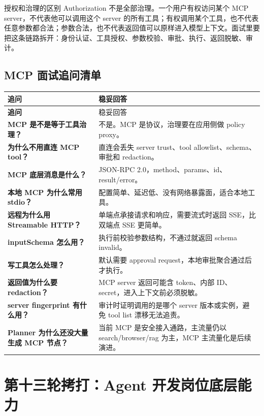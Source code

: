 \begin{analysisBox}{授权和治理的区别}
Authorization 不是全部治理。一个用户有权访问某个 MCP server，不代表他可以调用这个 server 的所有工具；有权调用某个工具，也不代表任意参数都合法；参数合法，也不代表返回值可以原样进入模型上下文。面试里要把这条链路拆开：身份认证、工具授权、参数校验、审批、执行、返回脱敏、审计。
\end{analysisBox}

\subsection{MCP 面试追问清单}
\begin{longtable}{>{\bfseries}p{}p{}}
\toprule
追问 & 稳妥回答 \\
\midrule
\endfirsthead
\toprule
追问 & 稳妥回答 \\
\midrule
\endhead
MCP 是不是等于工具治理？ & 不是。MCP 是协议，治理要在应用侧做 policy proxy。 \\
为什么不用直连 MCP tool？ & 直连会丢失 server trust、tool allowlist、schema、审批和 redaction。 \\
MCP 底层消息是什么？ & JSON-RPC 2.0，method、params、id、result/error。 \\
本地 MCP 为什么常用 stdio？ & 配置简单、延迟低、没有网络暴露面，适合本地工具。 \\
远程为什么用 Streamable HTTP？ & 单端点承接请求和响应，需要流式时返回 SSE，比双端点 SSE 更简单。 \\
inputSchema 怎么用？ & 执行前校验参数结构，不通过就返回 schema invalid。 \\
写工具怎么处理？ & 默认需要 approval request，本地审批聚合通过后才执行。 \\
返回值为什么要 redaction？ & MCP server 返回可能含 token、内部 ID、secret，进入上下文前必须脱敏。 \\
server fingerprint 有什么用？ & 审计时证明调用的是哪个 server 版本或实例，避免 tool list 漂移无法追责。 \\
Planner 为什么还没大量生成 MCP 节点？ & 当前 MCP 是安全接入通路，主流量仍以 search/browser/rag 为主，MCP 主流量化是后续演进。 \\
\bottomrule
\end{longtable}

\section{第十三轮拷打：Agent 开发岗位底层能力}

